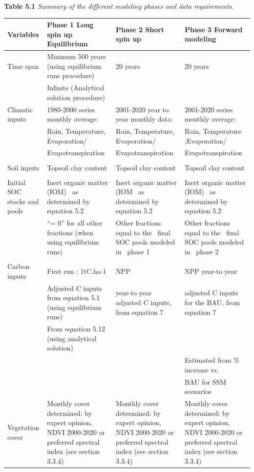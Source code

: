 \documentclass[
  10pt,
  b5paper,
]{book}
\begin{document}
\textbf{Table 5.1} \emph{Summary of the different modeling phases and data requirements.}

\begin{table}
\centering
\begin{tabular}{l|l|l|l}
\hline
Variables & Phase 1 Long spin up Equilibrium & Phase 2 Short spin up & Phase 3 Forward modeling\\
\hline
Time span & Minimum 500 years (using equilibrium runs procedure) & 20 years & 20 years\\
\hline
 & Infinite (Analytical solution procedure) &  & \\
\hline
Climatic inputs & 1980-2000 series monthly average: & 2001-2020 year to year monthly data: & 2001-2020 series monthly average:\\
\hline
 & Rain, Temperature, Evaporation/ & Rain, Temperature, Evaporation/ & Rain, Temperature ,Evaporation/\\
\hline
 & Evapotranspiration & Evapotranspiration & Evapotranspiration\\
\hline
 &  &  & \\
\hline
Soil inputs & Topsoil clay content & Topsoil clay content & Topsoil clay content\\
\hline
 &  &  & \\
\hline
Initial SOC stocks and pools & Inert organic matter (IOM)  as determined by equation 5.2 & Inert organic matter (IOM  as determined by equation 5.2 & Inert organic matter (IOM)  as determined by equation 5.2\\
\hline
 & “= 0” for all other fractions (when using equilibrium runs) & Other fractions equal to the  final SOC pools modeled in  phase 1 & Other fractions equal to the  final SOC pools modeled in  phase 2\\
\hline
 &  &  & \\
\hline
Carbon inputs & First run : 1tC.ha-1 & NPP & NPP year-to year\\
\hline
 & Adjusted C inputs from equation 5.1 (using equilibrium runs) & year-to year adjusted C inputs, from equation 7 & adjusted C inputs for the BAU, from equation 7\\
\hline
 & From equation 5.12 (using analytical solution) &  & \\
\hline
 &  &  & Estimated from \% increase vs.\\
\hline
 &  &  & BAU for SSM scenarios\\
\hline
Vegetation cover & Monthly cover determined: by expert opinion, NDVI 2000-2020 or preferred spectral index (see section 3.3.4) & Monthly cover determined: by expert opinion, NDVI 2000-2020 or preferred spectral index (see section 3.3.4) & Monthly cover determined: by expert opinion, NDVI 2000-2020 or preferred spectral index (see section 3.3.4)\\

\end{tabular}
\end{table}
\end{document}
